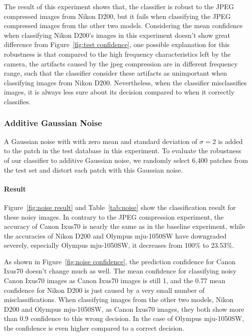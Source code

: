 \documentclass[a4paper, 9pt, twocolumn]{extarticle}
\begin{document}
The result of this experiment shows that, the classifier is robust to the JPEG compressed images from Nikon D200, but it fails when classifying the JPEG compressed images from the other two models. Considering the mean confidence when classifying Nikon D200's images in this experiment doesn't show great difference from Figure~\ref{fig:test confidence}, one possible explanation for this robustness is that compared to the high frequency characteristics left by the camera,  the artifacts caused by the jpeg compression are in different frequency range, such that the classifier consider these artifacts as unimportant when classifying images from Nikon D200. Nevertheless, when the classifier misclassifies images, it is always less sure about its decision compared to when it correctly classifies.

\subsubsection{Additive Gaussian Noise}
\label{section:noise}

A Gaussian noise with with zero mean and standard deviation of $ \sigma = 2 $ is added to the patch in the test database in this experiment. To evaluate the robustness of our classifier to additive Gaussian noise, we randomly select 6,400 patches from the test set and distort each patch with this Gaussian noise.

\paragraph{Result}
\label{section:noise result}

Figure~\ref{fig:noise result} and Table~\ref{tab:noise} show the classification result for these noisy images. In contrary to the JPEG compression experiment, the accuracy of Canon Ixus70 is nearly the same as in the baseline experiment, while the accuracies of Nikon D200 and Olympus mju-1050SW have downgraded severely, especially Olympus mju-1050SW, it decreases from 100\% to 23.53\%.

As shown in Figure~\ref{fig:noise confidence}, the prediction confidence for Canon Ixus70 doesn't change much as well. The mean confidence for classifying noisy Canon Ixus70 images as Canon Ixus70 images is still 1, and the 0.77 mean confidence for Nikon D200 is just caused by a very small number of misclassifications. When classifying images from the other two models, Nikon D200 and Olympus mju-1050SW, as Canon Ixus70 images, they both show more than 0.9 confidence to this wrong decision. In the case of Olympus mju-1050SW, the confidence is even higher compared to a correct decision. 
\end{document}
